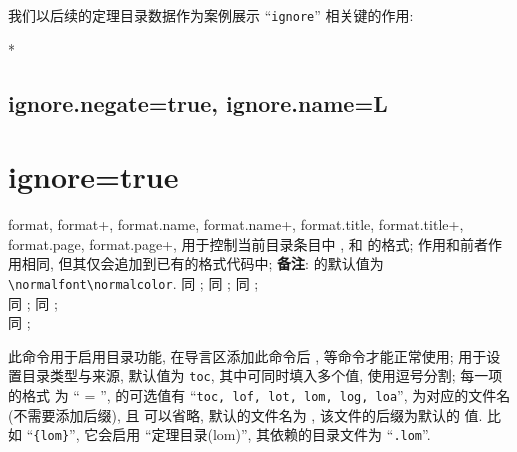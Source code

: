 我们以后续的定理目录数据作为案例展示 ``\texttt{ignore}'' 相关键的作用:
\begin{DocExample}*
{
  \ztocformat\subsection
    {
      ignore.negate=true, 
      ignore.name={\textbf {L}\;}
    }
  \ztocformat\section{ignore=true} %
  \zthmtoc
}
\end{DocExample}
\setlength{\dvalWidth}{2.25em}
\setlength{\dvalwidth}{2em}



\begin{keyval}{
  format, format+, 
  format.name, format.name+, 
  format.title, format.title+,
  format.page, format.page+,
  }
   用于控制当前目录条目中 ,  和  的格式;  
  作用和前者作用相同, 但其仅会追加到已有的格式代码中; \textbf{备注}:  的默认值为 \verb|\normalfont\normalcolor|. 
   同 ;
   同 ;
   同 ;\\
   同 ; 
   同 ;\\ 
   同 ; 
\end{keyval}


\begin{function}[updated=2025-07-06]{\ztocenable}
  \begin{syntax}
  \end{syntax}
  此命令用于启用目录功能, 在导言区添加此命令后 ,  等命令才能正常使用;
   用于设置目录类型与来源, 默认值为 \verb|toc|, 其中可同时填入多个值, 使用逗号分割; 每一项的格式
  为 `` = '',  的可选值有 ``\texttt{toc, lof, lot, lom, log, loa}'',  
  为对应的文件名(不需要添加后缀), 且  可以省略, 默认的文件名为 , 该文件的后缀为默认的  
  值. 比如 ``\texttt{\{lom\}}'', 它会启用 ``定理目录(lom)'', 其依赖的目录文件为 ``\texttt{.lom}''.
\end{function}


